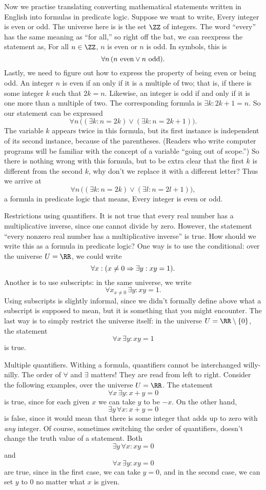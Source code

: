 Now we practise translating converting mathematical statements written in English into formulas
in predicate logic. Suppose we want to write, Every integer is even or odd. The universe here is
is the set $\ZZ$ of integers. The word ``every'' has the same meaning as ``for all,'' so right
off the bat, we can reexpress the statement as, For all $n\in \ZZ$, $n$ is even or $n$ is odd.
In symbols, this is
$$ \forall n\,(n\ \hbox{even} \vee n\ \hbox{odd}).$$
Lastly, we need to figure out how to express the property of being even or being odd.
An integer $n$ is even if an only if it is a multiple of two; that is, if there is some integer $k$
such that $2k = n$. Likewise, an integer is odd if and only if it is one more than a multiple of two.
The corresponding formula is $\exists k : 2k+1 = n$.
So our statement can be expressed
$$\forall n\, \bigl((\exists k : n = 2k)\vee (\exists k : n = 2k+1)\bigr).$$
The variable $k$ appears twice in this formula, but its first instance is independent of its second instance,
because of the parentheses. (Readers who write computer programs will be familiar with the concept of
a variable ``going out of scope.'') So there is nothing wrong with this formula, but to be extra
clear that the first $k$ is different from the second $k$, why don't we replace it with a different letter?
Thus we arrive at
$$\forall n\, \bigl((\exists k : n = 2k)\vee (\exists l : n = 2l+1)\bigr),$$
a formula in predicate logic that means, Every integer is even or odd.

\medskip\boldlabel Restrictions using quantifiers. It is not true that every real number has a multiplicative
inverse, since one cannot divide by zero. However, the statement ``every nonzero real number has a multiplicative
inverse'' is true. How should we write this as a formula in predicate logic?
One way is to use the conditional: over the universe $U = \RR$, we could write
$$\forall x : (x\ne 0 \Rightarrow \exists y : xy = 1).$$
Another is to use subscripts: in the same universe, we write
$$\forall x_{x\ne 0}\, \exists y : xy = 1.$$
Using subscripts is slightly informal, since we didn't formally define above what a subscript is supposed
to mean, but it is something that you might encounter. The last way is to simply restrict the universe itself:
in the universe $U = \RR\setminus\{0\}$, the statement
$$\forall x\, \exists y : xy = 1$$
is true.

\medskip\boldlabel Multiple quantifiers. Withing a formula, quantifiers cannot be interchanged
willy-nilly. The order of $\forall$ and $\exists$ matters! They are read from left to right.
Consider the following examples, over the universe $U = \RR$.
The statement
$$ \forall x\, \exists y : x+y = 0$$
is true, since for each given $x$ we can take $y$ to be $-x$. On the other hand,
$$ \exists y\, \forall x : x+y = 0$$
is false, since it would mean that there is some integer that adds up to zero with {\it any} integer.
Of course, sometimes switching the order of quantifiers, doesn't change the truth value of a statement.
Both
$$\exists y\, \forall x: xy = 0$$
and
$$\forall x\, \exists y: xy = 0$$
are true, since in the first case, we can take $y = 0$, and in the second case, we can set $y$ to $0$ no
matter what $x$ is given.

